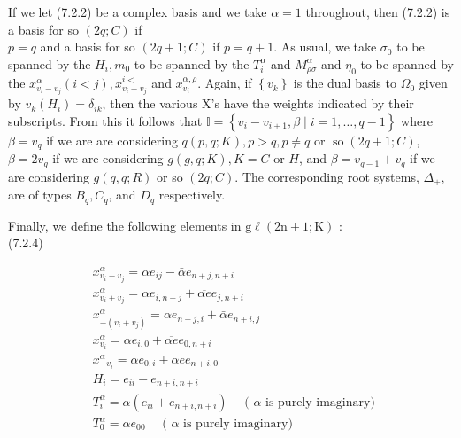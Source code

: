 \documentclass[10pt]{article}
\begin{document}
If we let (7.2.2) be a complex basis and we take $\alpha=1$ throughout, then (7.2.2) is a basis for so $(2 q ; C)$ if\\
$p=q$ and a basis for so $(2 q+1 ; C)$ if $p=q+1$. As usual, we take $\sigma_{0}$ to be spanned by the $H_{i}, m_{0}$ to be spanned by the $T_{i}^{\alpha}$ and $M_{\rho \sigma}^{\alpha}$ and $\eta_{0}$ to be spanned by the $x_{v_{i}-v_{j}}^{\alpha}(i<j), x_{v_{i}+v_{j}}^{i<}$ and $x_{v_{i}}^{\alpha, \rho}$. Again, if $\left\{v_{k}\right\}$ is the dual basis to $\Omega_{0}$ given by $v_{k}\left(H_{i}\right)=\delta_{i k}$, then the various X's have the weights indicated by their subscripts. From this it follows that $\mathbb{I}=\left\{v_{i}-v_{i+1}, \beta \mid i=1, \ldots, q-1\right\}$ where $\beta=v_{q}$ if we are are considering $q(p, q ; K), p>q, p \neq q$ or $\operatorname{so}(2 q+1 ; C)$, $\beta=2 v_{q}$ if we are considering $g(g, q ; K), K=C$ or $H$, and $\beta=v_{q-1}+v_{q}$ if we are considering $g(q, q ; R)$ or so $(2 q ; C)$. The corresponding root systems, $\Delta_{+}$, are of types $B_{q}, C_{q}$, and $D_{q}$ respectively.

Finally, we define the following elements in $\mathrm{g} \ell(2 \mathrm{n}+1 ; \mathrm{K})$ :\\
(7.2.4)

$$
\begin{aligned}
& x_{v_{i}-v_{j}}^{\alpha}=\alpha e_{i j}-\bar{\alpha} e_{n+j, n+i} \\
& x_{v_{i}+v_{j}}^{\alpha}=\alpha e_{i, n+j}+\overline{\alpha e} e_{j, n+i} \\
& x_{-\left(v_{i}+v_{j}\right)}^{\alpha}=\alpha e_{n+j, i}+\bar{\alpha} e_{n+i, j} \\
& x_{v_{i}}^{\alpha}=\alpha e_{i, 0}+\overline{\alpha e} e_{0, n+i} \\
& x_{-v_{i}}^{\alpha}=\alpha e_{0, i}+\overline{\alpha e} e_{n+i, 0} \\
& H_{i}=e_{i i}-e_{n+i, n+i} \\
& T_{i}^{\alpha}=\alpha\left(e_{i i}+e_{n+i, n+i}\right) \quad \text { ( } \alpha \text { is purely imaginary) } \\
& T_{0}^{\alpha}=\alpha e_{00} \quad \text { ( } \alpha \text { is purely imaginary) }
\end{aligned}
$$
\end{document}
